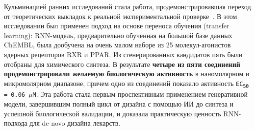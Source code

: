 Кульминацией ранних исследований стала работа, продемонстрировавшая переход от теоретических выкладок к реальной экспериментальной проверке~\cite{merk2018novo}. В этом исследовании был применен подход на основе переноса обучения (transfer learning): RNN-модель, предварительно обученная на большой базе данных ChEMBL, была дообучена на очень малом наборе из 25 молекул-агонистов ядерных рецепторов RXR и PPAR. Из сгенерированных кандидатов пять были отобраны для химического синтеза. В результате \textbf{четыре из пяти соединений продемонстрировали желаемую биологическую активность} в наномолярном и микромолярном диапазоне, причем одно из соединений показало активность \texttt{EC\textsubscript{50} = 0.06 $\mu$M}. Эта работа стала первым проспективным применением генеративной модели, завершившим полный цикл от дизайна с помощью ИИ до синтеза и успешной биологической валидации, и доказала практическую ценность RNN-подхода для de novo дизайна лекарств.
